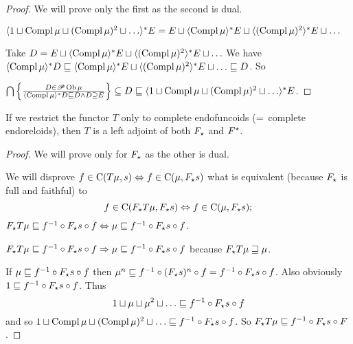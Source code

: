 \begin{proof}
  We will prove only the first as the second is dual.
  
  $\langle 1 \sqcup \operatorname{Compl} \mu \sqcup (\operatorname{Compl} \mu)^2 \sqcup \ldots
  \rangle^{\ast} E = E \sqcup \langle \operatorname{Compl} \mu \rangle^{\ast} E \sqcup
  \langle (\operatorname{Compl} \mu)^2 \rangle^{\ast} E \sqcup \ldots$
  
  Take $D = E \sqcup \langle \operatorname{Compl} \mu \rangle^{\ast} E \sqcup \langle
  (\operatorname{Compl} \mu)^2 \rangle^{\ast} E \sqcup \ldots$ We have $\langle
  \operatorname{Compl} \mu \rangle^{\ast} D \sqsubseteq \langle \operatorname{Compl} \mu
  \rangle^{\ast} E \sqcup \langle (\operatorname{Compl} \mu)^2 \rangle^{\ast} E \sqcup
  \ldots \sqsubseteq D$. So
  
  $\bigcap \left\{ \frac{ D \in \mathscr{P} \operatorname{Ob} \mu }{
  \langle \operatorname{Compl} \mu \rangle^{\ast} D \sqsubseteq D \wedge D \supseteq E
  }\right\} \subseteq D \sqsubseteq \langle 1 \sqcup \operatorname{Compl} \mu \sqcup
  (\operatorname{Compl} \mu)^2 \sqcup \ldots \rangle^{\ast} E$.
\end{proof}

\begin{thm}
  If we restrict the functor $T$ only to complete endofuncoids (=~complete
  endoreloids), then $T$ is a left adjoint of both $F_{\star}$ and
  $F^{\star}$.
\end{thm}

\begin{proof}
  We will prove only for $F_{\star}$ as the other is dual.
  
  We will disprove $f \in \mathrm{C} (T \mu, s) \Leftrightarrow f \in
  \mathrm{C} (\mu, F_{\star} s)$ what is equivalent (because $F_{\star}$ is
  full and faithful) to
  \[ f \in \mathrm{C} (F_{\star} T \mu, F_{\star} s) \Leftrightarrow f \in
     \mathrm{C} (\mu, F_{\star} s) ; \]
  $F_{\star} T \mu \sqsubseteq f^{- 1} \circ F_{\star} s \circ f
  \Leftrightarrow \mu \sqsubseteq f^{- 1} \circ F_{\star} s \circ f$.
  
  $F_{\star} T \mu \sqsubseteq f^{- 1} \circ F_{\star} s \circ f \Rightarrow
  \mu \sqsubseteq f^{- 1} \circ F_{\star} s \circ f$ because $F_{\star} T \mu
  \sqsupseteq \mu$.
  
  If $\mu \sqsubseteq f^{- 1} \circ F_{\star} s \circ f$ then $\mu^n
  \sqsubseteq f^{- 1} \circ (F_{\star} s)^n \circ f = f^{- 1} \circ F_{\star}
  s \circ f$. Also obviously $1 \sqsubseteq f^{- 1} \circ F_{\star} s \circ
  f$. Thus
  \[ 1 \sqcup \mu \sqcup \mu^2 \sqcup \ldots \sqsubseteq f^{- 1} \circ
     F_{\star} s \circ f \]
  and so $1 \sqcup \operatorname{Compl} \mu \sqcup (\operatorname{Compl} \mu)^2 \sqcup \ldots
  \sqsubseteq f^{- 1} \circ F_{\star} s \circ f$. So $F_{\star} T \mu
  \sqsubseteq f^{- 1} \circ F_{\star} s \circ F$.
\end{proof}

